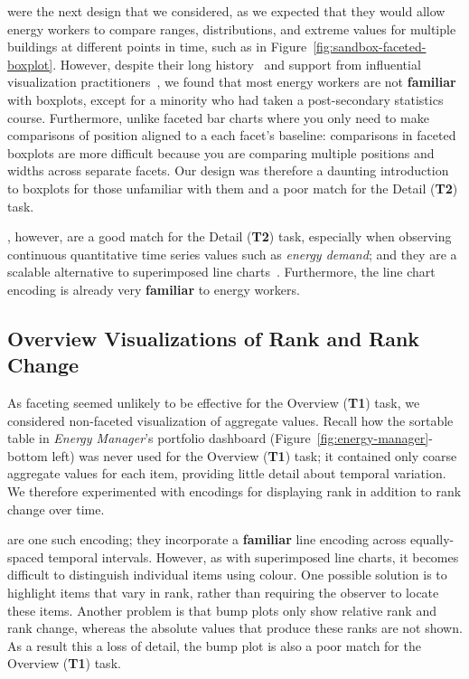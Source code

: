 \documentclass[journal]{vgtc}                %
\newcommand{\bqstart}[1]{\vspace{1mm} \noindent{\textbf{#1}}}
\begin{document}
\bqstart{Faceted boxplots} were the next design that we considered, as we expected that they would allow energy workers to compare ranges, distributions, and extreme values for multiple buildings at different points in time, such as in Figure~\ref{fig:sandbox-faceted-boxplot}.
However, despite their long history~\cite{Wickham2011} and support from influential visualization practitioners~\cite{Few2014}, we found that most energy workers are not {\bf familiar} with boxplots, except for a minority who had taken a post-secondary statistics course.
Furthermore, unlike faceted bar charts where you only need to make comparisons of position aligned to a each facet's baseline: comparisons in faceted boxplots are more difficult because you are comparing multiple positions and widths across separate facets. 
Our design was therefore a daunting introduction to boxplots for those unfamiliar with them and a poor match for the Detail ({\bf T2}) task.

\bqstart{Faceted line charts}, however, are a good match for the Detail ({\bf T2}) task, especially when observing continuous quantitative time series values such as {\it energy demand}; and they are a scalable alternative to superimposed line charts~\cite{Javed2010}. 
Furthermore, the line chart encoding is already very {\bf familiar} to energy workers.


\subsection{Overview Visualizations of Rank and Rank Change}
\label{design-ranking}


As faceting seemed unlikely to be effective for the Overview ({\bf T1}) task, we considered non-faceted visualization of aggregate values.
Recall how the sortable table in {\it Energy Manager}'s portfolio dashboard (Figure~\ref{fig:energy-manager}-bottom left) was never used for the Overview ({\bf T1}) task; it contained only coarse aggregate values for each item, providing little detail about temporal variation.
We therefore experimented with encodings for displaying rank in addition to rank change over time.

\bqstart{Bump plots} are one such encoding; they incorporate a {\bf familiar} line encoding across equally-spaced temporal intervals. 
However, as with superimposed line charts, it becomes difficult to distinguish individual items using colour.
One possible solution is to highlight items that vary in rank, rather than requiring the observer to locate these items.
Another problem is that bump plots only show relative rank and rank change, whereas the absolute values that produce these ranks are not shown. 
As a result this a loss of detail, the bump plot is also a poor match for the Overview ({\bf T1}) task.
\end{document}
